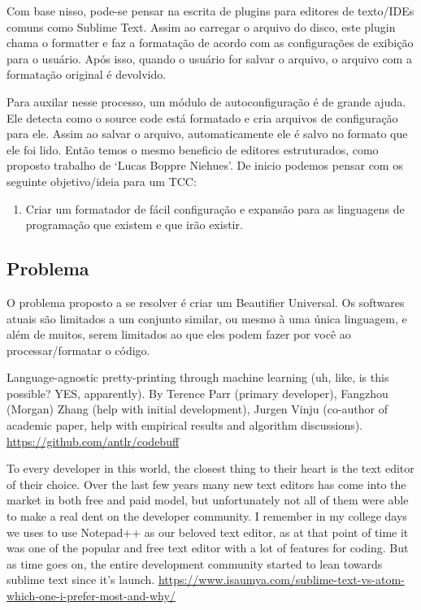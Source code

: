 \begin{englishtext}
    Com base nisso, pode-se pensar na escrita de plugins para editores de texto/IDEs comuns como
    Sublime Text. Assim ao carregar o arquivo do disco, este plugin chama o formatter e faz a
    formatação de acordo com as configurações de exibição para o usuário. Após isso, quando o
    usuário for salvar o arquivo, o arquivo com a formatação original é devolvido.

    Para auxilar nesse processo, um módulo de autoconfiguração é de grande ajuda. Ele detecta como o
    source code está formatado e cria arquivos de configuração para ele. Assim ao salvar o arquivo,
    automaticamente ele é salvo no formato que ele foi lido. Então temos o mesmo beneficio de
    editores estruturados, como proposto trabalho de `Lucas Boppre Niehues'. De inicio podemos
    pensar com os seguinte objetivo/ideia para um TCC:

    \medskip
    \begin{bluebox}
    \begin{enumerate}[nolistsep]
        \item Criar um formatador de fácil configuração e expansão para as linguagens de
              programação que existem e que irão existir.
    \end{enumerate}
    \end{bluebox}



\subsection{Problema}

    O problema proposto a se resolver é criar um Beautifier Universal. Os softwares atuais são
    limitados a um conjunto similar, ou mesmo à uma única linguagem, e além de muitos, serem
    limitados ao que eles podem fazer por você ao processar/formatar o código. \cite{universalCodeFormatter}

    Language-agnostic pretty-printing through machine learning (uh, like, is this possible? YES, apparently). By Terence Parr (primary developer), Fangzhou (Morgan) Zhang (help with initial development), Jurgen Vinju (co-author of academic paper, help with empirical results and algorithm discussions).
    \url{https://github.com/antlr/codebuff}


    To every developer in this world, the closest thing to their heart is the text editor of their
    choice. Over the last few years many new text editors has come into the market in both free and
    paid model, but unfortunately not all of them were able to make a real dent on the developer
    community. I remember in my college days we uses to use Notepad++ as our beloved text editor, as
    at that point of time it was one of the popular and free text editor with a lot of features for
    coding. But as time goes on, the entire development community started to lean towards sublime
    text since it’s launch.
    \url{https://www.isaumya.com/sublime-text-vs-atom-which-one-i-prefer-most-and-why/}


\end{englishtext}
